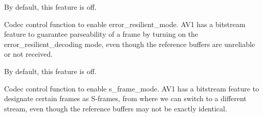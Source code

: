 \begin{Desc}
\begin{description}
By default, this feature is off. \item[{\em 
A\+V1\+E\+\_\+\+S\+E\+T\+\_\+\+E\+R\+R\+O\+R\+\_\+\+R\+E\+S\+I\+L\+I\+E\+N\+T\+\_\+\+M\+O\+DE\hypertarget{group__aom__encoder_ggae78dde67a6d78f332e9bdba0dde42db5aa0d049453fced5f8079861b16e356c69}{}\label{group__aom__encoder_ggae78dde67a6d78f332e9bdba0dde42db5aa0d049453fced5f8079861b16e356c69}
}]Codec control function to enable error\+\_\+resilient\+\_\+mode. A\+V1 has a bitstream feature to guarantee parseability of a frame by turning on the error\+\_\+resilient\+\_\+decoding mode, even though the reference buffers are unreliable or not received.

By default, this feature is off. \item[{\em 
A\+V1\+E\+\_\+\+S\+E\+T\+\_\+\+S\+\_\+\+F\+R\+A\+M\+E\+\_\+\+M\+O\+DE\hypertarget{group__aom__encoder_ggae78dde67a6d78f332e9bdba0dde42db5a3ec44c6d8987ca88f8f635b7c098c11e}{}\label{group__aom__encoder_ggae78dde67a6d78f332e9bdba0dde42db5a3ec44c6d8987ca88f8f635b7c098c11e}
}]Codec control function to enable s\+\_\+frame\+\_\+mode. A\+V1 has a bitstream feature to designate certain frames as S-\/frames, from where we can switch to a different stream, even though the reference buffers may not be exactly identical.


\end{description}
\end{Desc}
